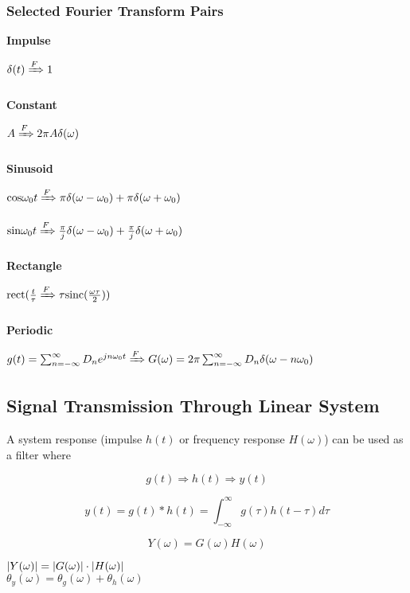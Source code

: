 \documentclass[11pt]{article}
\DeclarePairedDelimiter{\abs}{\lvert}{\rvert}
\begin{document}
\subsubsection{Selected Fourier Transform Pairs}
\textbf{Impulse} 
\hfill \break \par \quad
$\delta(t) \xRightarrow{F} 1$ \\ \\ 
\textbf{Constant}
\hfill \break \par \quad
$A \xRightarrow{F} 2\pi A\delta(\omega)$ \\ \\
\textbf{Sinusoid}
\hfill \break \par \quad
$\text{cos}\omega_0t \xRightarrow{F} \pi \delta(\omega - \omega_0) + \pi\delta(\omega + \omega_0)$
\par \quad
$\text{sin}\omega_0t \xRightarrow{F} \frac{\pi}{j} \delta(\omega - \omega_0) + \frac{\pi}{j}\delta(\omega + \omega_0)$ \\ \\
\textbf{Rectangle}
\hfill \break \par \quad
$\text{rect}(\frac{t}{\tau} \xRightarrow{F} \tau\text{sinc}(\frac{\omega\tau}{2}))$ \\ \\
\textbf{Periodic}
\hfill \break \par \quad
$g(t) = \sum_{n=-\infty}^{\infty}D_ne^{jn\omega_0t} \xRightarrow{F} G(\omega) = 2\pi \sum_{n=-\infty}^{\infty} D_n\delta(\omega-n\omega_0)$

\subsection{Signal Transmission Through Linear System}

A system response (impulse $h(t)$ or frequency response $H(\omega)$) can be used as a filter where 

$$g(t) \Rightarrow h(t) \Rightarrow y(t)$$

$$y(t) = g(t) * h(t) = \int_{-\infty}^{\infty}g(\tau)h(t - \tau)d\tau$$

$$Y(\omega) = G(\omega)H(\omega)$$

$\abs{Y(\omega)} = \abs{G(\omega)} \cdot \abs{H(\omega)}$ \\
$\theta_y(\omega) = \theta_g(\omega) + \theta_h(\omega)$
\end{document}

